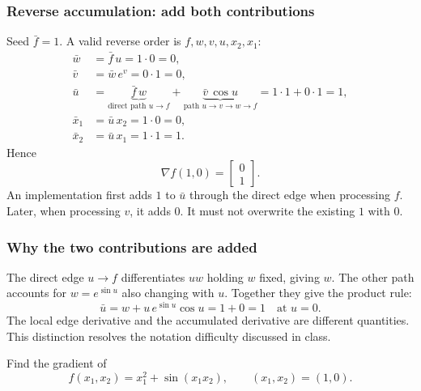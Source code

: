 \subsubsection*{Reverse accumulation: add both contributions}
Seed $\bar f=1$. A valid reverse order is $f,w,v,u,x_2,x_1$:
\begin{align*}
 \bar w&=\bar f\,u=1\cdot0=0,\\
 \bar v&=\bar w\,e^v=0\cdot1=0,\\
 \bar u&=\underbrace{\bar f\,w}_{\text{direct path }u\to f}
       +\underbrace{\bar v\,\cos u}_{\text{path }u\to v\to w\to f}
       =1\cdot1+0\cdot1=1,\\
 \bar x_1&=\bar u\,x_2=1\cdot0=0,\\
 \bar x_2&=\bar u\,x_1=1\cdot1=1.
\end{align*}
Hence
\[
 \boxed{\nabla f(1,0)=\begin{bmatrix}0\\1\end{bmatrix}.}
\]
An implementation first adds $1$ to $\bar u$ through the direct edge when processing $f$. Later, when processing $v$, it adds $0$. It must not overwrite the existing $1$ with $0$.

\subsubsection*{Why the two contributions are added}
The direct edge $u\to f$ differentiates $uw$ holding $w$ fixed, giving $w$. The other path accounts for $w=e^{\sin u}$ also changing with $u$. Together they give the product rule:
\[
 \bar u=w+u\,e^{\sin u}\cos u=1+0=1\quad\text{at }u=0.
\]
The local edge derivative and the accumulated derivative are different quantities. This distinction resolves the notation difficulty discussed in class.

\begin{example}
Find the gradient of
\[
 f(x_1,x_2)=x_1^2+\sin(x_1x_2),\qquad (x_1,x_2)=(1,0).
\]
\end{example}

